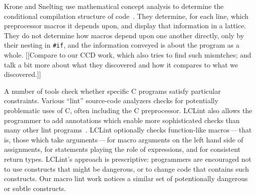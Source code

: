 \documentclass[10pt]{article}
\begin{document}
Krone and Snelting use mathematical concept analysis to determine the
conditional compilation structure of code~\cite{Krone94}.  They determine,
for each line, which preprocessor macros it depends upon, and display that
information in a lattice.  They do not determine how macros depend upon one
another directly, only by their nesting in {\tt \#if}, and the information
conveyed is about the program as a whole.  [[Compare to our CCD work, which
also tries to find such mismtches; and talk a bit more about what they
discovered and how it compares to what we discovered.]]


A number of tools check whether specific C programs satisfy particular
constraints.  Various ``lint'' source-code analyzers checks for
potentially problematic uses of C, often including the C preprocessor.
LCLint also allows the programmer to add annotations which enable more
sophisticated checks than many other lint programs~\cite{Evans-fse94}.
LCLint optionally checks function-like macros\,---\,that is, those which
take arguments\,---\,for macro arguments on the left hand side of
assignments, for statements playing the role of expressions, and for
consistent return types.  LCLint's approach is prescriptive: programmers
are encouraged not to use constructs that might be dangerous, or to
change code that contains such constructs.  Our macro lint work notices
a similar set of potentionally dangerous or subtle constructs.

\end{document}
